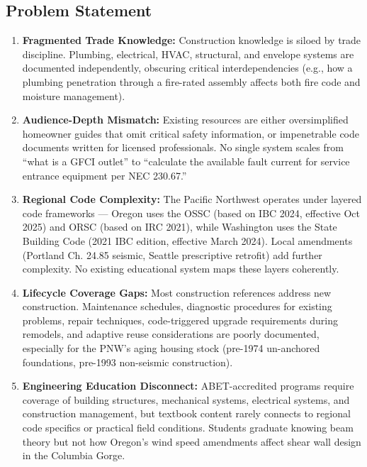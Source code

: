 \documentclass[11pt,letterpaper]{article}
\begin{document}
\subsection{Problem Statement}

\begin{enumerate}[leftmargin=2em]
\item \textbf{Fragmented Trade Knowledge:} Construction knowledge is siloed by trade discipline. Plumbing, electrical, HVAC, structural, and envelope systems are documented independently, obscuring critical interdependencies (e.g., how a plumbing penetration through a fire-rated assembly affects both fire code and moisture management).

\item \textbf{Audience-Depth Mismatch:} Existing resources are either oversimplified homeowner guides that omit critical safety information, or impenetrable code documents written for licensed professionals. No single system scales from ``what is a GFCI outlet'' to ``calculate the available fault current for service entrance equipment per NEC 230.67.''

\item \textbf{Regional Code Complexity:} The Pacific Northwest operates under layered code frameworks --- Oregon uses the OSSC (based on IBC 2024, effective Oct 2025) and ORSC (based on IRC 2021), while Washington uses the State Building Code (2021 IBC edition, effective March 2024). Local amendments (Portland Ch. 24.85 seismic, Seattle prescriptive retrofit) add further complexity. No existing educational system maps these layers coherently.

\item \textbf{Lifecycle Coverage Gaps:} Most construction references address new construction. Maintenance schedules, diagnostic procedures for existing problems, repair techniques, code-triggered upgrade requirements during remodels, and adaptive reuse considerations are poorly documented, especially for the PNW's aging housing stock (pre-1974 un-anchored foundations, pre-1993 non-seismic construction).

\item \textbf{Engineering Education Disconnect:} ABET-accredited programs require coverage of building structures, mechanical systems, electrical systems, and construction management, but textbook content rarely connects to regional code specifics or practical field conditions. Students graduate knowing beam theory but not how Oregon's wind speed amendments affect shear wall design in the Columbia Gorge.
\end{enumerate}
\end{document}

